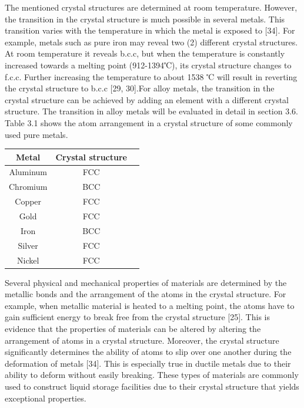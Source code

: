 \documentclass[12pt]{report}
\begin{document}
The mentioned crystal structures are determined at room temperature.  However, the transition in the crystal structure is much possible in several metals. This transition varies with the temperature in which the metal is exposed to [34]. For example, metals such as pure iron may reveal two (2) different crystal structures. At room temperature it reveals b.c.c, but when the temperature is constantly increased towards a melting point (912-1394℃), its crystal structure changes to f.c.c. Further increasing the temperature to about 1538 ℃ will result in reverting the crystal structure to b.c.c [29, 30].For alloy metals, the transition in the crystal structure can be achieved by adding an element with a different crystal structure. The transition in alloy metals will be evaluated in detail in section 3.6. Table 3.1 shows the atom arrangement in a crystal structure of some commonly used pure metals.


\begin{center}
\begin{tabular}{ c c c}
\hline
Metal & Crystal structure \\
\hline
Aluminum & FCC \\
Chromium & BCC \\
Copper & FCC \\
Gold & FCC \\
Iron & BCC \\
Silver & FCC \\
Nickel & FCC \\
\hline
\end{tabular}
\end{center}

Several physical and mechanical properties of materials are determined by the metallic bonds and the arrangement of the atoms in the crystal structure. For example, when metallic material is heated to a melting point, the atoms have to gain sufficient energy to break free from the crystal structure [25]. This is evidence that the properties of materials can be altered by altering the arrangement of atoms in a crystal structure. Moreover, the crystal structure significantly determines the ability of atoms to slip over one another during the deformation of metals [34]. This is especially true in ductile metals due to their ability to deform without easily breaking. These types of materials are commonly used to construct liquid storage facilities due to their crystal structure that yields exceptional properties.
\end{document}
